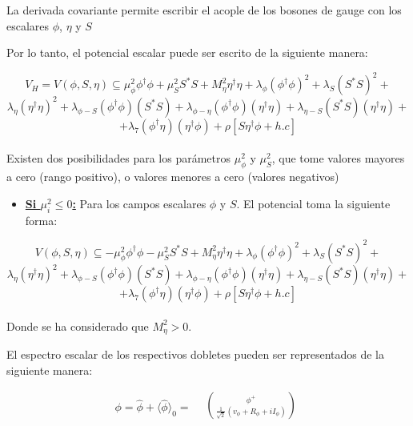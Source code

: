 \documentclass[12pt]{article}
\begin{document}
La derivada covariante permite escribir el acople de los bosones de gauge
con los escalares \(\phi\), $\eta$ y $ S $



Por lo tanto, el potencial escalar puede ser escrito de la siguiente manera: 

    \begin{equation}
         V_H = V(\phi, S, \eta) \subseteq  \mu_\phi^2\phi^\dagger\phi +  \mu_S^2 S^* S+ M_\eta^2\eta^\dagger\eta + \lambda_\phi(\phi^\dagger\phi)^2+ \lambda_S(S^* S)^2 +     
    \end{equation}
\[ \lambda_\eta(\eta^\dagger\eta)^2 + 
     \lambda_{\phi-S}(\phi^\dagger\phi)(S^* S)+ \lambda_{\phi-\eta}(\phi^\dagger\phi)(\eta^\dagger\eta)+    \lambda_{\eta-S}(S^* S)(\eta^\dagger\eta)+  \]
    \[   + \lambda_7(\phi^\dagger\eta)(\eta^\dagger\phi) + \rho [S\eta^\dagger\phi+ h.c]  \] \\
    
    
Existen dos posibilidades para los parámetros  \( \mu_\phi^2\) y \( \mu_S^2\),  que tome valores mayores a cero (rango positivo), o valores menores a cero (valores negativos)

\begin{itemize}
\item\underline{ \textbf{Si \( \mu_i^2\leq 0 \):}} Para los campos escalares $\phi$ y $S$. El potencial toma la siguiente forma:
\end{itemize}
 
 
    \begin{equation}
     \label{eq:PotencialDiracSee}
          V(\phi, S, \eta) \subseteq  -\mu_\phi^2\phi^\dagger\phi -  \mu_S^2 S^* S + M_\eta^2\eta^\dagger\eta + \lambda_\phi(\phi^\dagger\phi)^2+ \lambda_S(S^* S)^2 +   
    \end{equation}
\[ \lambda_\eta(\eta^\dagger\eta)^2 + 
     \lambda_{\phi-S}(\phi^\dagger\phi)(S^* S)+ \lambda_{\phi-\eta}(\phi^\dagger\phi)(\eta^\dagger\eta)+    \lambda_{\eta-S}(S^* S)(\eta^\dagger\eta)+  \]
    \[   + \lambda_7(\phi^\dagger\eta)(\eta^\dagger\phi) +  \rho [S\eta^\dagger\phi+ h.c]  \] \\

Donde se ha considerado que $M_\eta^2>0$. 


El espectro escalar de los respectivos dobletes pueden ser representados  de la siguiente manera: 

\begin{equation}
\label{eq:campophi}
    \phi=\hat\phi+ \langle \hat\phi \rangle_0 = \begin{aligned}
  &  \binom{\phi^{+}}{\frac{1}{\sqrt{2}}(v_\phi+ R_\phi + iI_\phi) } \\ 
\end{aligned}
\end{equation}
\end{document}
